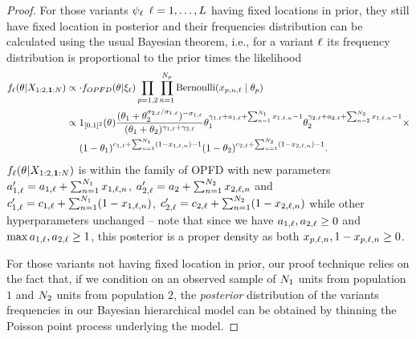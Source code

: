 \begin{proof}
    For those variants $\psi_{\ell}$ $\ell=1,\dots, L$ having fixed locations in prior, they still have fixed location in posterior and their frequencies distribution can be calculated using the usual Bayesian theorem, i.e., for a variant $\ell$ its frequency distribution is proportional to the prior times the likelihood
    \begin{align*}
        f_{\variantidx}(\vecvariantfreq{}| \pilotdata)&\propto \cdot f_{OPFD}(\vecvariantfreq{} | \allopfdhyper_{\variantidx}) \prod_{\popidx=1,2} \prod_{\unitidx=1}^{\samplesize{\popidx}} \BER(x_{\popidx, \unitidx, \variantidx} \mid \variantfreqperpop{\popidx})\\
        &\propto 1_{[0,1]^2}(\vecvariantfreq{}) \frac{(\variantfreqperpop{1}+\variantfreqperpop{2}^{\rate{2, \variantidx}/\rate{1, \variantidx}})^{-\rate{1, \variantidx}}}{(\variantfreqperpop{1}+\variantfreqperpop{2})^{\corr{1, \variantidx}+\corr{2, \variantidx}}}\variantfreqperpop{1}^{\corr{1, \variantidx}+\fixlocparam{1, \variantidx} + \sum_{\unitidx=1}^{\samplesize{1}} x_{1,\variantidx, \unitidx} -1}\variantfreqperpop{2}^{\corr{2, \variantidx}+\fixlocparam{2, \variantidx} +\sum_{\unitidx=2}^{\samplesize{2}} x_{1,\variantidx, \unitidx} -1} \times \\
		&~~~~(1-\variantfreqperpop{1})^{\conc{1, \variantidx}+\sum_{\unitidx=1}^{\samplesize{1}} (1-x_{1,\variantidx, \unitidx})-1}(1-\variantfreqperpop{2})^{\conc{2, \variantidx}+\sum_{\unitidx=1}^{\samplesize{2}} (1-x_{2,\variantidx, \unitidx})-1}. 
    \end{align*}
    $f_{\variantidx}(\vecvariantfreq{}| \pilotdata)$ is within the family of OPFD with new parameters $a_{1,\ell}'=a_{1, \ell} + \sum_{n=1}^{N_{1}} x_{1,\ell, n}$, $a_{2, \ell}'=a_{2} + \sum_{n=1}^{N_{2}} x_{2,\ell, n}$ and $c_{1,\ell}' = c_{1,\ell}+\sum_{n=1}^{N_{1}} (1-x_{1,\ell, n})$, $c_{2,\ell}' = c_{2,\ell}+\sum_{n=1}^{N_{2}} (1-x_{2,\ell, n})$ while other hyperparameters unchanged -- note that since we have $a_{1,\ell},a_{2,\ell}\ge 0$ and $\max{a_{1,\ell},a_{2,\ell}}\ge 1$, this posterior is a proper density as both $x_{p,\ell, n}, 1-x_{p,\ell, n}\ge 0$.


    For those variants not having fixed location in prior, our proof technique relies on the fact that, if we condition on an observed sample of $N_{1}$ units from population $1$ and $N_{2}$ units from population $2$, the \emph{posterior} distribution of the variants frequencies in our Bayesian hierarchical model can be obtained by thinning the Poisson point process underlying the model. 


\end{proof}

